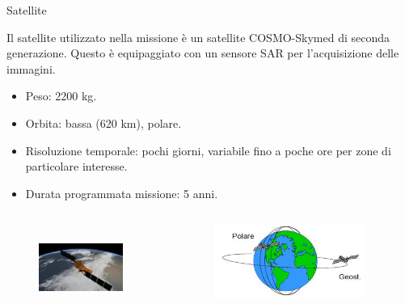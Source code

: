 \documentclass[xcolor=table]{beamer}
\begin{document}
\begin{frame}{Satellite}
\begin{block}{}
    Il satellite utilizzato nella missione è un satellite COSMO-Skymed di seconda generazione. Questo è equipaggiato con un sensore SAR per l'acquisizione delle immagini.

    \begin{itemize}
        \item Peso: 2200  kg.
        \item Orbita: bassa (620 km), polare.
        \item Risoluzione temporale: pochi giorni, variabile fino a poche ore per zone di particolare interesse.
        \item Durata programmata missione: 5 anni.
    \end{itemize}
\end{block}

\begin{columns}

    \begin{figure}
        \centering
        \includegraphics[width=0.9\textwidth,height=2.8cm]{cosmo.jpg}
    \end{figure}

    \begin{figure}
        \centering
        \includegraphics[width=0.9\textwidth]{orbita.jpg}
    \end{figure}


    
\end{columns}



\end{frame}
\end{document}

